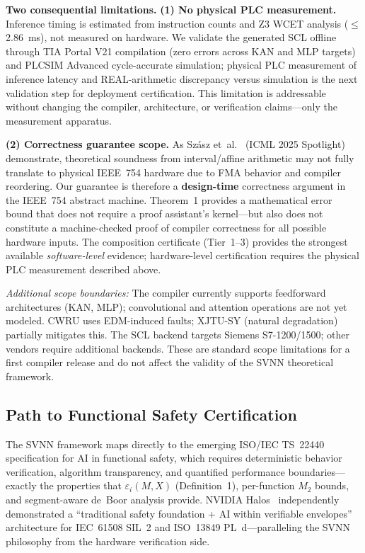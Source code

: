 \documentclass[journal,onecolumn]{IEEEtran}
\begin{document}
\vspace{4pt}
\noindent\textbf{Two consequential limitations.}
\textbf{(1) No physical PLC measurement.}
Inference timing is estimated from instruction counts and Z3 WCET analysis
($\leq$2.86~ms), not measured on hardware. We validate the generated SCL
offline through TIA Portal V21 compilation (zero errors across KAN and MLP
targets) and PLCSIM Advanced cycle-accurate simulation; physical PLC
measurement of inference latency and REAL-arithmetic discrepancy versus
simulation is the next validation step for deployment certification. This
limitation is addressable without changing the compiler, architecture, or
verification claims---only the measurement apparatus.

\textbf{(2) Correctness guarantee scope.}
As Sz\'{a}sz et~al.~\cite{szasz2025floating} (ICML 2025 Spotlight)
demonstrate, theoretical soundness from interval/affine arithmetic may
not fully translate to physical IEEE~754 hardware due to FMA behavior and
compiler reordering. Our guarantee is therefore a \textbf{design-time}
correctness argument in the IEEE~754 abstract machine. Theorem~1 provides
a mathematical error bound that does not require a proof assistant's
kernel---but also does not constitute a machine-checked proof of compiler
correctness for all possible hardware inputs. The composition
certificate (Tier~1--3) provides the strongest available \textit{software-level}
evidence; hardware-level certification requires the physical PLC measurement
described above.

\textit{Additional scope boundaries:} The compiler currently supports
feedforward architectures (KAN, MLP); convolutional and attention operations
are not yet modeled. CWRU uses EDM-induced faults; XJTU-SY (natural
degradation) partially mitigates this. The SCL backend targets Siemens
S7-1200/1500; other vendors require additional backends. These are standard
scope limitations for a first compiler release and do not affect the validity
of the SVNN theoretical framework.

\subsection{Path to Functional Safety Certification}
\label{sec:safety-certification}

The SVNN framework maps directly to the emerging ISO/IEC TS~22440~\cite{iso22440}
specification for AI in functional safety, which requires deterministic
behavior verification, algorithm transparency, and quantified performance
boundaries---exactly the properties that $\varepsilon_i(M,X)$ (Definition~1),
per-function $M_2$ bounds, and segment-aware de~Boor analysis provide.
NVIDIA Halos~\cite{nvidia_halos_2026} independently demonstrated a ``traditional
safety foundation + AI within verifiable envelopes'' architecture for IEC~61508
SIL~2 and ISO~13849 PL~d---paralleling the SVNN philosophy from the hardware
verification side.
\end{document}
